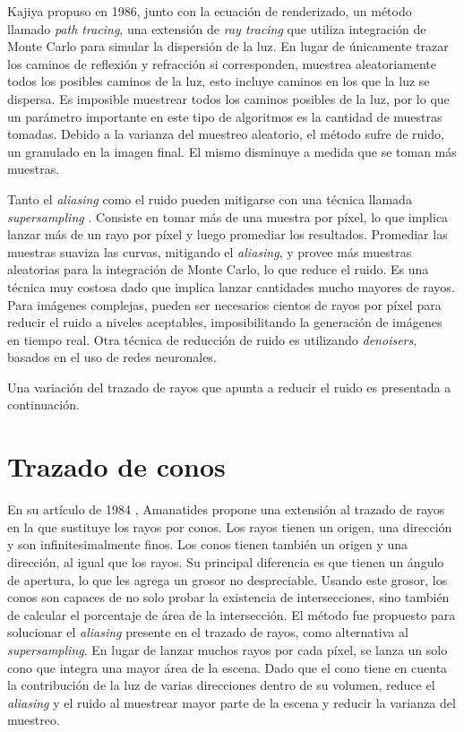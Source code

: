 Kajiya propuso en 1986\cite{rendering-equation}, junto con la ecuación de renderizado, un método llamado \textit{path tracing}, una extensión de \textit{ray tracing} que utiliza integración de Monte Carlo para simular la dispersión de la luz.
En lugar de únicamente trazar los caminos de reflexión y refracción si corresponden, muestrea aleatoriamente todos los posibles caminos de la luz, esto incluye caminos en los que la luz se dispersa.
Es imposible muestrear todos los caminos posibles de la luz, por lo que un parámetro importante en este tipo de algoritmos es la cantidad de muestras tomadas.
Debido a la varianza del muestreo aleatorio, el método sufre de ruido, un granulado en la imagen final.
El mismo disminuye a medida que se toman más muestras.


Tanto el \textit{aliasing} como el ruido pueden mitigarse con una técnica llamada \textit{supersampling} \cite{whitted-1980}. %
Consiste en tomar más de una muestra por píxel, lo que implica lanzar más de un rayo por píxel y luego promediar los resultados.
Promediar las muestras suaviza las curvas, mitigando el \textit{aliasing}, y provee más muestras aleatorias para la integración de Monte Carlo, lo que reduce el ruido.
Es una técnica muy costosa dado que implica lanzar cantidades mucho mayores de rayos.
Para imágenes complejas, pueden ser necesarios cientos de rayos por píxel para reducir el ruido a niveles aceptables, imposibilitando la generación de imágenes en tiempo real.
Otra técnica de reducción de ruido es utilizando \textit{denoisers}, basados en el uso de redes neuronales. %

Una variación del trazado de rayos que apunta a reducir el ruido es presentada a continuación.

\section{Trazado de conos}\label{sec:historical-cone-tracing}

En su artículo de 1984 \cite{ray-tracing-with-cones}, Amanatides propone una extensión al trazado de rayos en la que sustituye los rayos por conos.
Los rayos tienen un origen, una dirección y son infinitesimalmente finos.
Los conos tienen también un origen y una dirección, al igual que los rayos.
Su principal diferencia es que tienen un ángulo de apertura, lo que les agrega un grosor no despreciable.
Usando este grosor, los conos son capaces de no solo probar la existencia de intersecciones, sino también de calcular el porcentaje de área de la intersección.
El método fue propuesto para solucionar el \textit{aliasing} presente en el trazado de rayos, como alternativa al \textit{supersampling}.
En lugar de lanzar muchos rayos por cada píxel, se lanza un solo cono que integra una mayor área de la escena.
Dado que el cono tiene en cuenta la contribución de la luz de varias direcciones dentro de su volumen, reduce el \textit{aliasing} y el ruido al muestrear mayor parte de la escena y reducir la varianza del muestreo.

